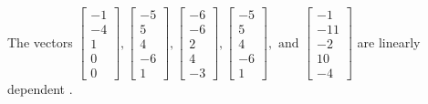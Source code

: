 \begin{exercise}
\begin{exerciseStatement}
  \end{exerciseStatement}
  \begin{exerciseAnswer}
   The vectors \(\left[\begin{array}{r}
-1 \\
-4 \\
1 \\
0 \\
0
\end{array}\right] , \left[\begin{array}{r}
-5 \\
5 \\
4 \\
-6 \\
1
\end{array}\right] , \left[\begin{array}{r}
-6 \\
-6 \\
2 \\
4 \\
-3
\end{array}\right] , \left[\begin{array}{r}
-5 \\
5 \\
4 \\
-6 \\
1
\end{array}\right] , \text{ and } \left[\begin{array}{r}
-1 \\
-11 \\
-2 \\
10 \\
-4
\end{array}\right]\) are 
  	 linearly dependent  .
  


  \end{exerciseAnswer}
\end{exercise}